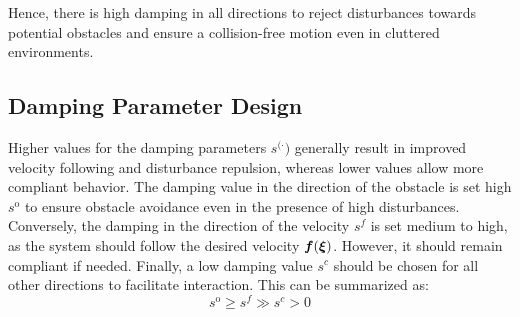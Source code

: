 Hence, there is high damping in all directions to reject disturbances towards potential obstacles and ensure a collision-free motion even in cluttered environments.

\subsection{Damping Parameter Design}
Higher values for the damping parameters $s^{(\cdot})$ generally result in improved velocity following and disturbance repulsion, whereas lower values allow more compliant behavior.
The damping value in the direction of the obstacle is set high $s^{\mathrm{o}}$ to ensure obstacle avoidance even in the presence of high disturbances. 
Conversely, the damping in the direction of the velocity $s^{f}$ is set medium to high, as the system should follow the desired velocity $\boldsymbol{f}(\boldsymbol{\xi})$. However, it should remain compliant if needed.
Finally, a low damping value $s^{c}$ should be chosen for all other directions to facilitate interaction.
This can be summarized as:
\begin{equation}
s^{\mathrm{o}} \geq s^{f} \gg s^{c} > 0
\end{equation}
